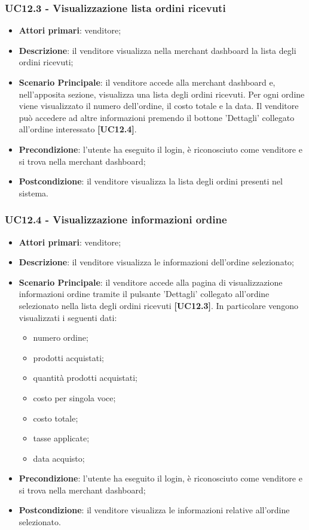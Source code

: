 \subsubsection{UC12.3 - Visualizzazione lista ordini ricevuti}
\begin{itemize}
\item \textbf{Attori primari}: venditore;
\item \textbf{Descrizione}: il venditore visualizza nella merchant dashboard la lista degli ordini ricevuti;
\item \textbf{Scenario Principale}: il venditore accede alla merchant dashboard e, nell'apposita sezione, visualizza una lista degli ordini ricevuti. Per ogni ordine viene visualizzato il numero dell'ordine, il costo totale e la data. Il venditore può accedere ad altre informazioni premendo il bottone 'Dettagli' collegato all'ordine interessato \textbf{[UC12.4]}.
\item \textbf{Precondizione}: l'utente ha eseguito il login, è riconosciuto come venditore e si trova nella merchant dashboard;
\item \textbf{Postcondizione}: il venditore visualizza la lista degli ordini presenti nel sistema.
\end{itemize}

\subsubsection{UC12.4 - Visualizzazione informazioni ordine}
\begin{itemize}
\item \textbf{Attori primari}: venditore;
\item \textbf{Descrizione}: il venditore visualizza le informazioni dell'ordine selezionato;
\item \textbf{Scenario Principale}: il venditore accede alla pagina di visualizzazione informazioni ordine tramite il pulsante 'Dettagli' collegato all'ordine selezionato nella lista degli ordini ricevuti \textbf{[UC12.3]}. In particolare vengono visualizzati i seguenti dati:
\begin{itemize}
	\item numero ordine;
	\item prodotti acquistati;
	\item quantità prodotti acquistati;
	\item costo per singola voce;
	\item costo totale;
	\item tasse applicate;
	\item data acquisto;
\end{itemize}
\item \textbf{Precondizione}: l'utente ha eseguito il login, è riconosciuto come venditore e si trova nella merchant dashboard;
\item \textbf{Postcondizione}: il venditore visualizza le informazioni relative all'ordine selezionato.
\end{itemize}

